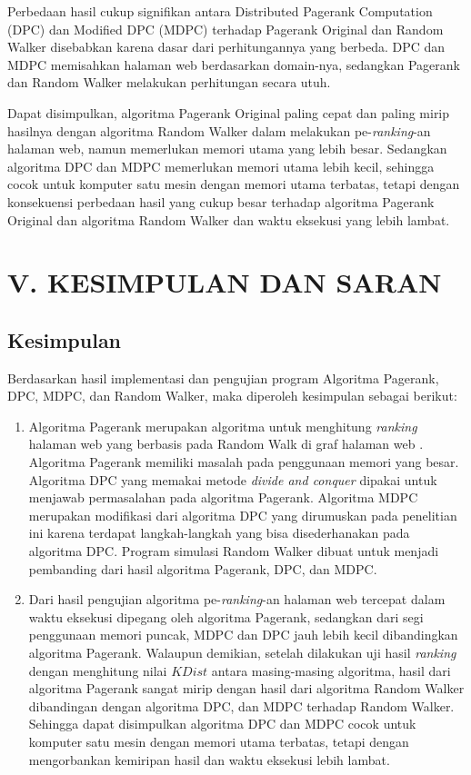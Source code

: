 \documentclass[
	a4paper, %
	12pt, %
	unnumberedsections, %
	twoside, %
]{LTJournalArticle}
\begin{document}
Perbedaan hasil cukup signifikan antara Distributed Pagerank Computation (DPC) dan Modified DPC (MDPC) terhadap Pagerank Original dan Random Walker disebabkan karena dasar dari perhitungannya yang berbeda. DPC dan MDPC memisahkan halaman web berdasarkan domain-nya, sedangkan Pagerank dan Random Walker melakukan perhitungan secara utuh.

Dapat disimpulkan, algoritma Pagerank Original paling cepat dan paling mirip hasilnya dengan algoritma Random Walker dalam melakukan pe-\textit{ranking}-an halaman web, namun memerlukan memori utama yang lebih besar. Sedangkan algoritma DPC dan MDPC memerlukan memori utama lebih kecil, sehingga cocok untuk komputer satu mesin dengan memori utama terbatas, tetapi dengan konsekuensi perbedaan hasil yang cukup besar terhadap algoritma Pagerank Original dan algoritma Random Walker dan waktu eksekusi yang lebih lambat.


\section{V. KESIMPULAN DAN SARAN}

\subsection{Kesimpulan}
Berdasarkan hasil implementasi dan pengujian program Algoritma Pagerank, DPC, MDPC, dan Random Walker, maka diperoleh kesimpulan sebagai berikut:

\begin{enumerate}
	\item Algoritma Pagerank merupakan algoritma untuk menghitung \textit{ranking} halaman web yang berbasis pada Random Walk di graf halaman web \citep{ilprints422}. Algoritma Pagerank memiliki masalah pada penggunaan memori yang besar. Algoritma DPC yang memakai metode \textit{divide and conquer} \citep{zhuetal2005distributedPagerank} dipakai untuk menjawab permasalahan pada algoritma Pagerank. Algoritma MDPC merupakan modifikasi dari algoritma DPC yang dirumuskan pada penelitian ini karena terdapat langkah-langkah yang bisa disederhanakan pada algoritma DPC. Program simulasi Random Walker dibuat untuk menjadi pembanding dari hasil algoritma Pagerank, DPC, dan MDPC.
	
	\item Dari hasil pengujian algoritma pe-\textit{ranking}-an halaman web tercepat dalam waktu eksekusi dipegang oleh algoritma Pagerank, sedangkan dari segi penggunaan memori puncak, MDPC dan DPC jauh lebih kecil dibandingkan algoritma Pagerank. Walaupun demikian, setelah dilakukan uji hasil \textit{ranking} dengan menghitung nilai $KDist$ antara masing-masing algoritma, hasil dari algoritma Pagerank sangat mirip dengan hasil dari algoritma Random Walker dibandingan dengan algoritma DPC, dan MDPC terhadap Random Walker. Sehingga dapat disimpulkan algoritma DPC dan MDPC cocok untuk komputer satu mesin dengan memori utama terbatas, tetapi dengan mengorbankan kemiripan hasil dan waktu eksekusi lebih lambat.
\end{enumerate}
\end{document}
